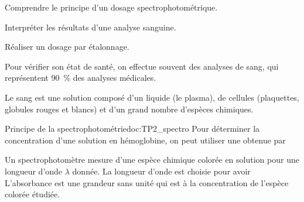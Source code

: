 \teteTermStssDosa

\vspace*{-30pt}
\vspace*{-4pt}


\begin{objectifs}
  \item Comprendre le principe d'un dosage spectrophotométrique.
  \item Interpréter les résultats d'une analyse sanguine.
  \item Réaliser un dosage par étalonnage.
\end{objectifs}

\begin{contexte}
  Pour vérifier son état de santé, on effectue souvent des analyses de sang, qui représentent \qty{90}{\percent} des analyses médicales.
  
  Le sang est une solution composé d'un liquide (le plasma), de cellules (plaquettes, globules rouges et blancs) et d'un grand nombre d'espèces chimiques.
  
\end{contexte}


\begin{doc}{Principe de la spectrophotométrie}{doc:TP2_spectro}
  Pour déterminer la concentration d'une solution en hémoglobine, on peut utiliser une  obtenue par 

  Un spectrophotomètre mesure  d'une espèce chimique colorée en solution pour une longueur d'onde $\lambda$ donnée.
  La longueur d'onde est choisie pour avoir 
  L'absorbance est une grandeur sans unité qui est  à la concentration de l'espèce colorée étudiée.
\end{doc}



